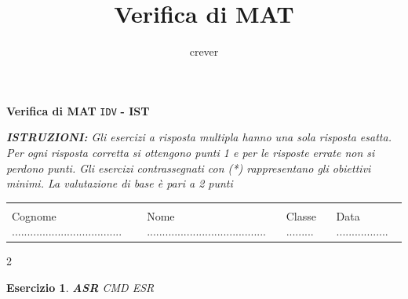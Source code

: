 \documentclass[a4paper,12pt]{article}
\title{Verifica di {MAT} }
\author{crever}
\theoremstyle{plain}
\newtheorem{esercizio}{Esercizio}
\begin{document}

\begin{center}
	{\textbf{Verifica di {MAT}} \verb!IDV! \textbf{- {IST} }}
\end{center}

\small{\textit{\textbf{ISTRUZIONI:} Gli esercizi a risposta multipla hanno una sola risposta esatta. Per ogni risposta corretta si ottengono punti 1 e per le risposte errate non si perdono punti. Gli esercizi contrassegnati con (*) rappresentano gli obiettivi minimi. La
valutazione di base è pari a 2 punti}}

\begin{center}
	\begin{tabular}{llll}
		\hline
		&  &  & \\
		Cognome .................................... & 
		Nome ....................................... &
		Classe ......... & 
		Data .................\\
		\hline
	\end{tabular}
\end{center}


\begin{multicols}{2}
	

\begin{esercizio}
	\emph{\textbf{ASR} {CMD}} %
	\medskip
	\newline
	\small{ESR}
	\bigskip
\end{esercizio}	

\end{multicols}
\end{document}
